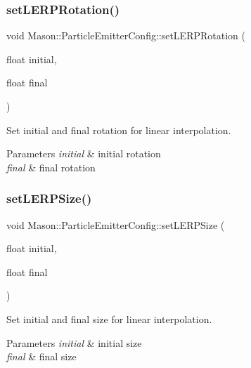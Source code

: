 \subsubsection{\texorpdfstring{set\+L\+E\+R\+P\+Rotation()}{setLERPRotation()}}
{\footnotesize\ttfamily void Mason\+::\+Particle\+Emitter\+Config\+::set\+L\+E\+R\+P\+Rotation (\begin{DoxyParamCaption}\item[{float}]{initial,  }\item[{float}]{final }\end{DoxyParamCaption})\hspace{0.3cm}{\ttfamily [inline]}}



Set initial and final rotation for linear interpolation. 


\begin{DoxyParams}{Parameters}
{\em initial} & initial rotation \\
\hline
{\em final} & final rotation \\
\hline
\end{DoxyParams}
\hypertarget{struct_mason_1_1_particle_emitter_config_a5495ec9be73c80df30115461b6af7733}{}\label{struct_mason_1_1_particle_emitter_config_a5495ec9be73c80df30115461b6af7733} 
\subsubsection{\texorpdfstring{set\+L\+E\+R\+P\+Size()}{setLERPSize()}}
{\footnotesize\ttfamily void Mason\+::\+Particle\+Emitter\+Config\+::set\+L\+E\+R\+P\+Size (\begin{DoxyParamCaption}\item[{float}]{initial,  }\item[{float}]{final }\end{DoxyParamCaption})\hspace{0.3cm}{\ttfamily [inline]}}



Set initial and final size for linear interpolation. 


\begin{DoxyParams}{Parameters}
{\em initial} & initial size \\
\hline
{\em final} & final size \\
\hline
\end{DoxyParams}
\hypertarget{struct_mason_1_1_particle_emitter_config_afe91ca5c2d60e5567fe589367b4fd3ef}{}\label{struct_mason_1_1_particle_emitter_config_afe91ca5c2d60e5567fe589367b4fd3ef} 
